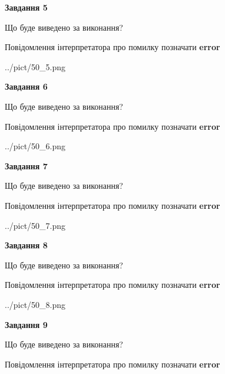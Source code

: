\documentclass[11pt, ukrainian]{article}
\begin{document}
{\begin {large}
{\begin {center}\textbf{Завдання 5}\end {center}}\par
Що буде виведено за виконання? \par
Повідомлення інтерпретатора про помилку позначати \textbf{error}

\begin{center}
	{../pict/50_5.png}
\end{center}
\newpage

{\begin {center}\textbf{Завдання 6}\end {center}}\par
Що буде виведено за виконання? \par
Повідомлення інтерпретатора про помилку позначати \textbf{error}

\begin{center}
	{../pict/50_6.png}
\end{center}
\newpage

{\begin {center}\textbf{Завдання 7}\end {center}}\par
Що буде виведено за виконання? \par
Повідомлення інтерпретатора про помилку позначати \textbf{error}

\begin{center}
	{../pict/50_7.png}
\end{center}
\newpage

{\begin {center}\textbf{Завдання 8}\end {center}}\par
Що буде виведено за виконання? \par
Повідомлення інтерпретатора про помилку позначати \textbf{error}

\begin{center}
	{../pict/50_8.png}
\end{center}
\newpage

{\begin {center}\textbf{Завдання 9}\end {center}}\par
Що буде виведено за виконання? \par
Повідомлення інтерпретатора про помилку позначати \textbf{error}


\end{large}}
\end{document}

